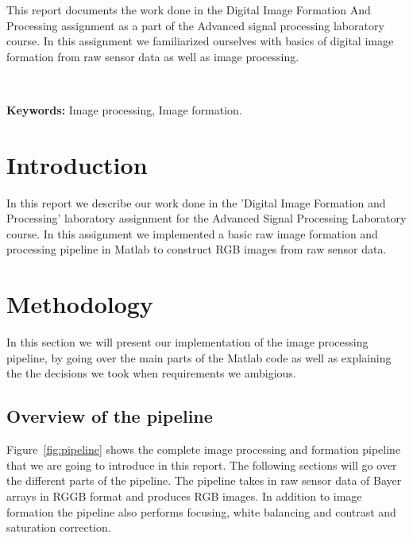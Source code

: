 \documentclass[12pt,a4paper,english
]{tunithesis}
\begin{document}
\vspace{0.5cm}


\noindent
This report documents the work done in the Digital Image Formation And Processing assignment as a part of the Advanced signal processing laboratory course. In this assignment we familiarized ourselves with basics of digital image formation from raw sensor data as well as image processing.

~

\noindent\textbf{Keywords:} Image processing, Image formation.





\setcounter{tocdepth}{3}              %
\tableofcontents                      %


\if@twoside
\cleardoublepage
\fi


\renewcommand{\chaptername}{} %


\chapter{Introduction}
\label{ch:intro} 
In this report we describe our work done in the 'Digital Image Formation and Processing' laboratory assignment for the Advanced Signal Processing Laboratory course. In this assignment we implemented a basic raw image formation and processing pipeline in Matlab to construct RGB images from raw sensor data.

\setcounter{page}{1} 

\chapter{Methodology}
\label{sec:methodology}
In this section we will present our implementation of the image processing pipeline, by going over the main parts of the Matlab code as well as explaining the the decisions we took when requirements we ambigious.

\section{Overview of the pipeline}
Figure~\ref{fig:pipeline} shows the complete image processing and formation pipeline that we are going to introduce in this report. The following sections will go over the different parts of the pipeline. The pipeline takes in raw sensor data of Bayer arrays in RGGB format and produces RGB images. In addition to image formation the pipeline also performs focusing, white balancing and contrast and saturation correction.
\end{document}
